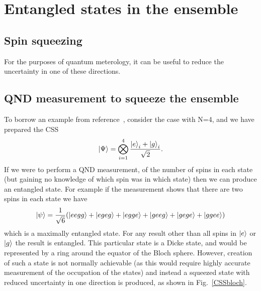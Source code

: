 \documentclass{article}
\begin{document}
\section{Entangled states in the ensemble}


\subsection{Spin squeezing}


For the purposes of quantum meterology, it can be useful to reduce the
uncertainty in one of these directions.

\subsection{QND measurement to squeeze the ensemble}




To borrow an example from
reference~\cite{Cox2016}, consider the case with N=4, and we have prepared the
CSS
%
\begin{equation}
  \ket{\Psi} = \bigotimes_{i=1}^4 \frac{\ket{e}_i + \ket{g}_i}{\sqrt{2}}.
\end{equation}
%
If we were to perform a QND measurement, of the number of spins in each state
(but gaining no knowledge of which spin was in which state) then we can produce
an entangled state. For example if the measurement shows that there are two
spins in each state we have
%
\begin{equation}
\ket{\psi} = \frac{1}{\sqrt{6}}(\ket{eegg} + \ket{egeg} + \ket{egge} +
\ket{geeg} + \ket{gege} + \ket{ggee})
\end{equation}
which is a maximally entangled state. For any result other than all spins in
$\ket{e}$ or $\ket{g}$ the result is entangled. This particular state is a
Dicke state, and would be represented by a ring around the equator of the Bloch
sphere. However, creation of such a state is not normally achievable (as this
would require highly accurate measurement of the occupation of the states) and
instead a squeezed state with reduced uncertainty in one direction is produced,
as shown in Fig.~\ref{CSSbloch}.
\end{document}
